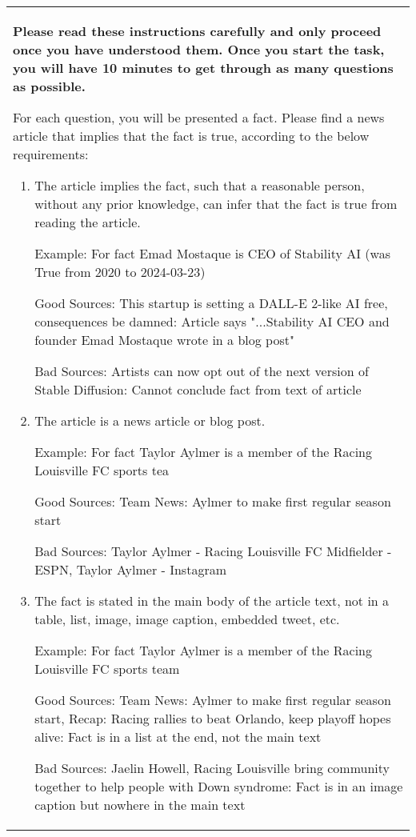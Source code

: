 \begin{table*}[]
    \centering
    \small
    \begin{tabular}{p{15cm}}
     \textbf{Please read these instructions carefully and only proceed once you have understood them. Once you start the task, you will have 10 minutes to get through as many questions as possible.}

    For each question, you will be presented a fact. Please find a news article that implies that the fact is true, according to the below requirements:
    \begin{enumerate}
    \item The article implies the fact, such that a reasonable person, without any prior knowledge, can infer that the fact is true from reading the article.

    Example: For fact Emad Mostaque is CEO of Stability AI (was True from 2020 to 2024-03-23)
        
    Good Sources: This startup is setting a DALL-E 2-like AI free, consequences be damned: Article says "...Stability AI CEO and founder Emad Mostaque wrote in a blog post"
    
    Bad Sources:  Artists can now opt out of the next version of Stable Diffusion: Cannot conclude fact from text of article

    \item The article is a news article or blog post.

    Example: For fact Taylor Aylmer is a member of the Racing Louisville FC sports tea

    Good Sources: Team News: Aylmer to make first regular season start

    Bad Sources: Taylor Aylmer - Racing Louisville FC Midfielder - ESPN, Taylor Aylmer - Instagram
         	
        
    \item The fact is stated in the main body of the article text, not in a table, list, image, image caption, embedded tweet, etc.

    Example: For fact Taylor Aylmer is a member of the Racing Louisville FC sports team

    Good Sources: Team News: Aylmer to make first regular season start, Recap: Racing rallies to beat Orlando, keep playoff hopes alive: Fact is in a list at the end, not the main text

    Bad Sources: Jaelin Howell, Racing Louisville bring community together to help people with Down syndrome: Fact is in an image caption but nowhere in the main text


\end{enumerate}
\end{tabular}
\end{table*}
